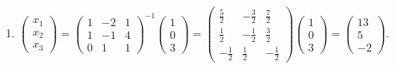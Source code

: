 \begin{enumerate}
			 \item %
			       $\begin{pmatrix}
					       x_1 \\
					       x_2 \\
					       x_3
				       \end{pmatrix} = \begin{pmatrix}
					       1 & -2 & 1 \\
					       1 & -1 & 4 \\
					       0 & 1  & 1
				       \end{pmatrix}^{-1}
				       \begin{pmatrix}
					       1 \\
					       0 \\
					       3
				       \end{pmatrix} = \begin{pmatrix}
					       \frac{5}{2}  & -\frac{3}{2} & \frac{7}{2}  \\
					       \frac{1}{2}  & -\frac{1}{2} & \frac{3}{2}  \\
					       -\frac{1}{2} & \frac{1}{2}  & -\frac{1}{2}
				       \end{pmatrix}
				       \begin{pmatrix}
					       1 \\
					       0 \\
					       3
				       \end{pmatrix} = \begin{pmatrix}
					       13 \\
					       5  \\
					       -2
				       \end{pmatrix}$.
		 \end{enumerate}


